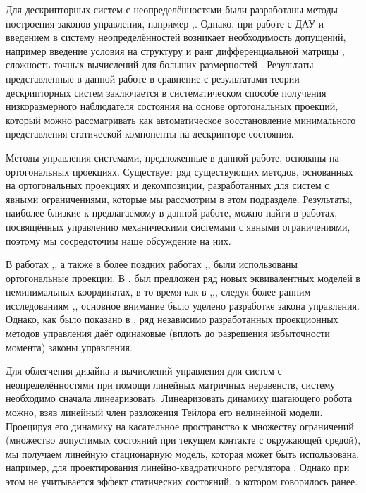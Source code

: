 Для дескрипторных систем с неопределённостями были разработаны методы построения законов управления, например \cite{LIN19993319},\cite{Darouach2014}. Однако, при работе с ДАУ и введением в систему неопределённостей возникает необходимость допущений, например введение условия на структуру и ранг дифференциальной матрицы \cite{Cheng2017}, сложность точных вычислений для больших размерностей \cite{Zhang2006}. Результаты представленные в данной работе в сравнение с результатами теории дескрипторных систем заключается в систематическом способе получения низкоразмерного наблюдателя состояния на основе ортогональных проекций, который можно рассматривать как автоматическое восстановление минимального представления статической компоненты на дескрипторе состояния. 

Методы управления системами, предложенные в данной работе, основаны на ортогональных проекциях. Существует ряд существующих методов, основанных на ортогональных проекциях и декомпозиции, разработанных для систем с явными ограничениями, которые мы рассмотрим в этом подразделе. Результаты, наиболее близкие к предлагаемому в данной работе, можно найти в работах, посвящённых управлению механическими системами с явными ограничениями, поэтому мы сосредоточим наше обсуждение на них.

В работах \cite{Aghili2003},\cite{Aghili2005}, а также в более поздних работах \cite{Mistry2010},\cite{Righetti2011},\cite{Righetti2013} были использованы ортогональные проекции. В \cite{Aghili2003},\cite{Aghili2005} был предложен ряд новых эквивалентных моделей в неминимальных координатах, в то время как в \cite{Mistry2010},\cite{Righetti2011},\cite{Righetti2013}, следуя более ранним исследованиям \cite{Khatib2007},\cite{Sentis2005}, основное внимание было уделено разработке закона управления. Однако, как было показано в \cite{Righetti2011}, ряд независимо разработанных проекционных методов управления даёт одинаковые (вплоть до разрешения избыточности момента) законы управления.

Для облегчения дизайна и вычислений управления для систем с неопределённостями при помощи линейных матричных неравенств, систему необходимо сначала линеаризовать. Линеаризовать динамику шагающего робота можно, взяв линейный член разложения Тейлора его нелинейной модели. Проецируя его динамику на касательное пространство к множеству ограничений (множество допустимых состояний при текущем контакте с окружающей средой), мы получаем линейную стационарную модель, которая может быть использована, например, для проектирования линейно-квадратичного регулятора \cite{mason2014full}. Однако при этом не учитывается эффект статических состояний, о котором говорилось ранее.


